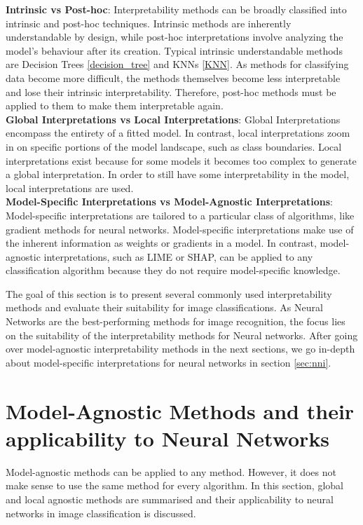 \textbf{Intrinsic vs Post-hoc}: Interpretability methods can be broadly classified into intrinsic and post-hoc techniques. Intrinsic methods are inherently understandable by design, while post-hoc interpretations involve analyzing the model's behaviour after its creation. Typical intrinsic understandable methods are Decision Trees \ref{decision_tree} and KNNs \ref{KNN}. As methods for classifying data become more difficult, the methods themselves become less interpretable and lose their intrinsic interpretability. Therefore, post-hoc methods must be applied to them to make them interpretable again.
\\
\textbf{Global Interpretations vs Local Interpretations}: Global Interpretations encompass the entirety of a fitted model. In contrast, local interpretations zoom in on specific portions of the model landscape, such as class boundaries. Local interpretations exist because for some models it becomes too complex to generate a global interpretation. In order to still have some interpretability in the model, local interpretations are used.
\\
\textbf{Model-Specific Interpretations vs Model-Agnostic Interpretations}: 
Model-specific interpretations are tailored to a particular class of algorithms, like gradient methods for neural networks. Model-specific interpretations make use of the inherent information as weights or gradients in a model. In contrast, model-agnostic interpretations, such as LIME or SHAP, can be applied to any classification algorithm because they do not require model-specific knowledge.

The goal of this section is to present several commonly used interpretability methods and evaluate their suitability for image classifications. As Neural Networks are the best-performing methods for image recognition, the focus lies on the suitability of the interpretability methods for Neural networks. After going over model-agnostic interpretability methods in the next sections, we go in-depth about model-specific interpretations for neural networks in section \ref{sec:nni}. 


\section{Model-Agnostic Methods and their applicability to Neural Networks}

Model-agnostic methods can be applied to any method. However, it does not make sense to use the same method for every algorithm. In this section, global and local agnostic methods are summarised and their applicability to neural networks in image classification is discussed. 


